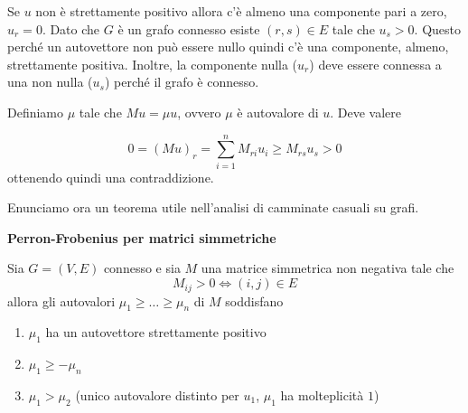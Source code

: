 \documentclass[12pt]{report}
\begin{document}
\begin{dimo}
    Se $u$ non è strettamente positivo allora c'è almeno una componente pari a zero, $u_r = 0$. Dato che $G$ è un grafo connesso esiste $(r,s) \in E$ tale che $u_s > 0$. Questo perché un autovettore non può essere nullo quindi c'è una componente, almeno, strettamente positiva. Inoltre, la componente nulla ($u_r$) deve essere connessa a una non nulla ($u_s$) perché il grafo è connesso.


    \noindent 
    Definiamo $\mu$ tale che $Mu = \mu u$, ovvero $\mu$ è autovalore di $u$. Deve valere

    $$0 = (Mu)_r = \sum_{i = 1}^n M_{ri} u_i \geq M_{rs} u_s > 0$$
    ottenendo quindi una contraddizione.
\end{dimo}

\noindent 
Enunciamo ora un teorema utile nell'analisi di camminate casuali su grafi.

\begin{teo}
    \textbf{Perron-Frobenius per matrici simmetriche}

    \noindent
    Sia $G = (V,E)$ connesso e sia $M$ una matrice simmetrica non negativa tale che 
    $$M_{ij} > 0 \Leftrightarrow (i,j) \in E$$
    allora gli autovalori $\mu_1\geq\dots\geq\mu_n$ di $M$ soddisfano

    \begin{enumerate}
        \item $\mu_1$ ha un autovettore strettamente positivo
        \item $\mu_1 \geq - \mu_n$
        \item $\mu_1 > \mu_2$ (unico autovalore distinto per $u_1$, $\mu_1$ ha molteplicità $1$)
    \end{enumerate}
\end{teo}
\end{document}
